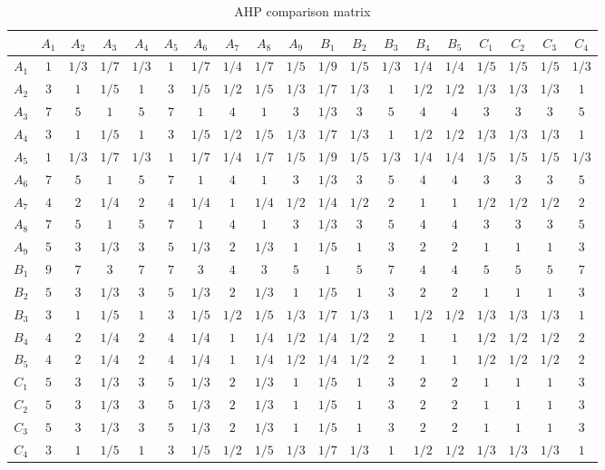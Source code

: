 \documentclass[12pt]{article}
\begin{document}
		{
			\fontsize{10}{18}\selectfont
			{
				\begin{longtable}{c|ccccccccc|ccccc||cccc}
					
					\caption{AHP comparison matrix}
					\label{tb:mat}\\
					
					\toprule
					&$A_1$&$A_2$&$A_3$&$A_4$&$A_5$&$A_6$&$A_7$&$A_8$&$A_9$&$B_1$&$B_2$&$B_3$&$B_4$&$B_5$&$C_1$&$C_2$&$C_3$&$C_4$\\
					\toprule
					$A_1$&$1$&$1/3$&$1/7$&$1/3$&$1$&$1/7$&$1/4$&$1/7$&$1/5$&$1/9$&$1/5$&$1/3$&$1/4$&$1/4$&$1/5$&$1/5$&$1/5$&$1/3$\\
					$A_2$&$3$&$1$&$1/5$&$1$&$3$&$1/5$&$1/2$&$1/5$&$1/3$&$1/7$&$1/3$&$1$&$1/2$&$1/2$&$1/3$&$1/3$&$1/3$&$1$\\
					$A_3$&$7$&$5$&$1$&$5$&$7$&$1$&$4$&$1$&$3$&$1/3$&$3$&$5$&$4$&$4$&$3$&$3$&$3$&$5$\\
					$A_4$&$3$&$1$&$1/5$&$1$&$3$&$1/5$&$1/2$&$1/5$&$1/3$&$1/7$&$1/3$&$1$&$1/2$&$1/2$&$1/3$&$1/3$&$1/3$&$1$\\
					$A_5$&$1$&$1/3$&$1/7$&$1/3$&$1$&$1/7$&$1/4$&$1/7$&$1/5$&$1/9$&$1/5$&$1/3$&$1/4$&$1/4$&$1/5$&$1/5$&$1/5$&$1/3$\\
					$A_6$&$7$&$5$&$1$&$5$&$7$&$1$&$4$&$1$&$3$&$1/3$&$3$&$5$&$4$&$4$&$3$&$3$&$3$&$5$\\
					$A_7$&$4$&$2$&$1/4$&$2$&$4$&$1/4$&$1$&$1/4$&$1/2$&$1/4$&$1/2$&$2$&$1$&$1$&$1/2$&$1/2$&$1/2$&$2$\\
					$A_8$&$7$&$5$&$1$&$5$&$7$&$1$&$4$&$1$&$3$&$1/3$&$3$&$5$&$4$&$4$&$3$&$3$&$3$&$5$\\
					$A_9$&$5$&$3$&$1/3$&$3$&$5$&$1/3$&$2$&$1/3$&$1$&$1/5$&$1$&$3$&$2$&$2$&$1$&$1$&$1$&$3$\\
					\midrule
					$B_1$&$9$&$7$&$3$&$7$&$7$&$3$&$4$&$3$&$5$&$1$&$5$&$7$&$4$&$4$&$5$&$5$&$5$&$7$\\
					$B_2$&$5$&$3$&$1/3$&$3$&$5$&$1/3$&$2$&$1/3$&$1$&$1/5$&$1$&$3$&$2$&$2$&$1$&$1$&$1$&$3$\\
					$B_3$&$3$&$1$&$1/5$&$1$&$3$&$1/5$&$1/2$&$1/5$&$1/3$&$1/7$&$1/3$&$1$&$1/2$&$1/2$&$1/3$&$1/3$&$1/3$&$1$\\
					$B_4$&$4$&$2$&$1/4$&$2$&$4$&$1/4$&$1$&$1/4$&$1/2$&$1/4$&$1/2$&$2$&$1$&$1$&$1/2$&$1/2$&$1/2$&$2$\\
					$B_5$&$4$&$2$&$1/4$&$2$&$4$&$1/4$&$1$&$1/4$&$1/2$&$1/4$&$1/2$&$2$&$1$&$1$&$1/2$&$1/2$&$1/2$&$2$\\
					\midrule
					\midrule
					$C_1$&$5$&$3$&$1/3$&$3$&$5$&$1/3$&$2$&$1/3$&$1$&$1/5$&$1$&$3$&$2$&$2$&$1$&$1$&$1$&$3$\\
					$C_2$&$5$&$3$&$1/3$&$3$&$5$&$1/3$&$2$&$1/3$&$1$&$1/5$&$1$&$3$&$2$&$2$&$1$&$1$&$1$&$3$\\
					$C_3$&$5$&$3$&$1/3$&$3$&$5$&$1/3$&$2$&$1/3$&$1$&$1/5$&$1$&$3$&$2$&$2$&$1$&$1$&$1$&$3$\\
					$C_4$&$3$&$1$&$1/5$&$1$&$3$&$1/5$&$1/2$&$1/5$&$1/3$&$1/7$&$1/3$&$1$&$1/2$&$1/2$&$1/3$&$1/3$&$1/3$&$1$\\
					\bottomrule
				\end{longtable}
			}
		}	
\end{document}
